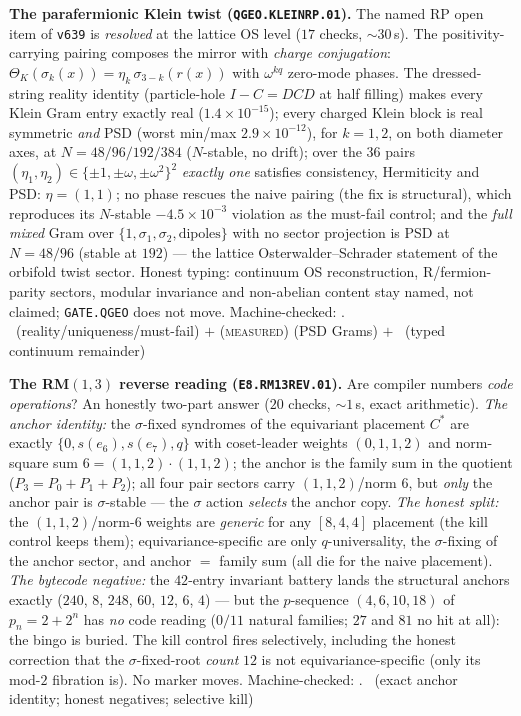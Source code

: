 \par\smallskip\noindent\textbf{The parafermionic Klein twist
(\texttt{QGEO.KLEINRP.01}).}
The named RP open item of \texttt{v639} is \emph{resolved} at the
lattice OS level ($17$ checks, ${\sim}30$\,s).  The
positivity-carrying pairing composes the mirror with \emph{charge
conjugation}: $\Theta_K(\sigma_k(x))=\eta_k\,\sigma_{3-k}(r(x))$ with
$\omega^{kq}$ zero-mode phases.  The dressed-string reality identity
(particle-hole $I-C=DCD$ at half filling) makes every Klein Gram entry
exactly real ($1.4\times10^{-15}$); every charged Klein block is real
symmetric \emph{and} PSD (worst min/max $2.9\times10^{-12}$), for
$k=1,2$, on both diameter axes, at $N=48/96/192/384$ ($N$-stable, no
drift); over the $36$ pairs $(\eta_1,\eta_2)\in\{\pm1,\pm\omega,
\pm\omega^2\}^2$ \emph{exactly one} satisfies consistency,
Hermiticity and PSD: $\eta=(1,1)$; no phase rescues the naive pairing
(the fix is structural), which reproduces its $N$-stable
$-4.5\times10^{-3}$ violation as the must-fail control; and the
\emph{full mixed} Gram over $\{1,\sigma_1,\sigma_2,
\text{dipoles}\}$ with no sector projection is PSD at $N=48/96$
(stable at $192$) --- the lattice Osterwalder--Schrader statement of
the orbifold twist sector.  Honest typing: continuum OS
reconstruction, R/fermion-parity sectors, modular invariance and
non-abelian content stay named, not claimed; \texttt{GATE.QGEO} does
not move.
Machine-checked: .
\mE\ (reality/uniqueness/must-fail) $+$ (\textsc{measured}) (PSD
Grams) $+$ \mC\ (typed continuum remainder)
\par\smallskip

\par\smallskip\noindent\textbf{The RM$(1,3)$ reverse reading
(\texttt{E8.RM13REV.01}).}
Are compiler numbers \emph{code operations}?  An honestly two-part
answer ($20$ checks, ${\sim}1$\,s, exact arithmetic).  \emph{The
anchor identity:} the $\sigma$-fixed syndromes of the equivariant
placement $C^*$ are exactly $\{0,s(e_6),s(e_7),q\}$ with coset-leader
weights $(0,1,1,2)$ and norm-square sum $6=(1,1,2)\cdot(1,1,2)$; the
anchor is the family sum in the quotient ($P_3=P_0{+}P_1{+}P_2$); all
four pair sectors carry $(1,1,2)$/norm $6$, but \emph{only} the anchor
pair is $\sigma$-stable --- the $\sigma$ action \emph{selects} the
anchor copy.  \emph{The honest split:} the $(1,1,2)$/norm-$6$ weights
are \emph{generic} for any $[8,4,4]$ placement (the kill control keeps
them); equivariance-specific are only $q$-universality, the
$\sigma$-fixing of the anchor sector, and anchor $=$ family sum (all
die for the naive placement).  \emph{The bytecode negative:} the
$42$-entry invariant battery lands the structural anchors exactly
($240$, $8$, $248$, $60$, $12$, $6$, $4$) --- but the $p$-sequence
$(4,6,10,18)$ of $p_n=2+2^n$ has \emph{no} code reading ($0/11$
natural families; $27$ and $81$ no hit at all): the bingo is buried.
The kill control fires selectively, including the honest correction
that the $\sigma$-fixed-root \emph{count} $12$ is not
equivariance-specific (only its mod-$2$ fibration is).  No marker
moves.
Machine-checked: .
\mE\ (exact anchor identity; honest negatives; selective kill)
\par\smallskip
